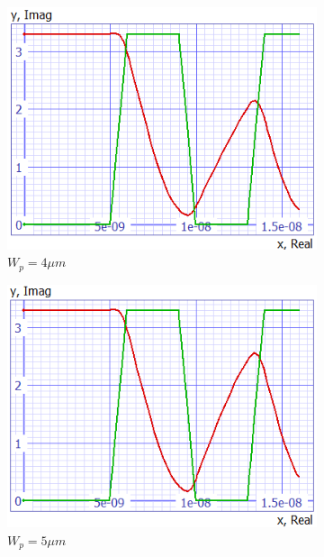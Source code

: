 \documentclass[../main.tex]{subfiles}
\begin{document}
{{			\begin{figure}[H]
				\centering
				\begin{subfigure}{0.3\textwidth}
					\centering
					\includegraphics[width=\textwidth]{plots/Q7_Wp4.png}
					\caption{$W_p = 4\mu m$}
					\label{fig:subfig1}
				\end{subfigure}
				\begin{subfigure}{0.3\textwidth}
					\centering
					\includegraphics[width=\textwidth]{plots/Q7_Wp5.png}
					\caption{$W_p = 5\mu m$}
					\label{fig:subfig2}
				\end{subfigure}
				\begin{subfigure}{0.3\textwidth}

\end{subfigure}
\end{figure}}}
\end{document}
